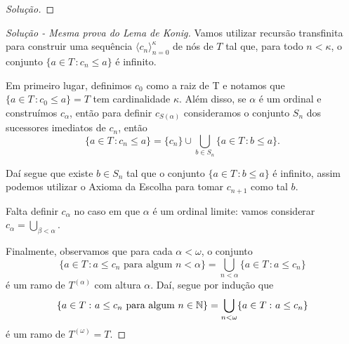 \documentclass[a4paper]{article}
\begin{document}
\begin{proof}[Solução]
  
  \end{proof}

  \begin{proof}[Solução - Mesma prova do Lema de Konig]
    Vamos utilizar recursão transfinita para  construir uma sequência
    \(\langle c_n\rangle_{n=0}^{\kappa}\)  de nós de \(T\) tal que,
  para todo \(n<\kappa\), o conjunto \(\{a\in T\,\colon c_n\leq a\}\) é
  infinito.

  Em primeiro lugar, definimos \(c_0\) como a raiz de T e notamos que
  \(\{a \in T\,\colon c_{0} \leq a \}= T\) tem cardinalidade \(\kappa\).
  Além disso, se \(\alpha\) é um ordinal e construímos \(c_\alpha\), então para definir
  \(c_{S(\alpha)}\) consideramos o conjunto \(S_n\) dos sucessores
  imediatos de \(c_n\), então
  \[
  \{a\in T\,\colon c_n\leq a\} = \{c_n\} \cup\bigcup_{b\in S_n} \{a\in T\,\colon b\leq a\}.
  \]

 Daí segue que existe \(b\in S_n\) tal que o conjunto \(\{a\in T\,\colon
 b\leq a\}\) é infinito, assim podemos utilizar o Axioma da Escolha para
 tomar \(c_{n+1}\) como tal \(b\).

 Falta definir \(c_\alpha\) no caso em que \(\alpha\) é um ordinal limite: vamos
 considerar \(c_\alpha=\bigcup_{\beta<\alpha}\).

 Finalmente, observamos que para cada \(\alpha<\omega\), o conjunto
 \[\{a\in T\,\colon  a\leq c_n \text{ para algum }
   n<\alpha\}=\bigcup_{n<\alpha}\{a\in T\,\colon a\leq c_n\}\] é
  um ramo de \(T^{(\alpha)}\) com altura \(\alpha\). Daí,
  segue por indução que \[\{a\in T\,\colon a\leq c_n \text{ para algum }
    n\in\mathbb{N}\}=\bigcup_{n <\omega}\{a\in T\,\colon a\leq c_n\}\]
  é um ramo de \(T^{(\omega)}=T\).
  \end{proof}
\end{document}
